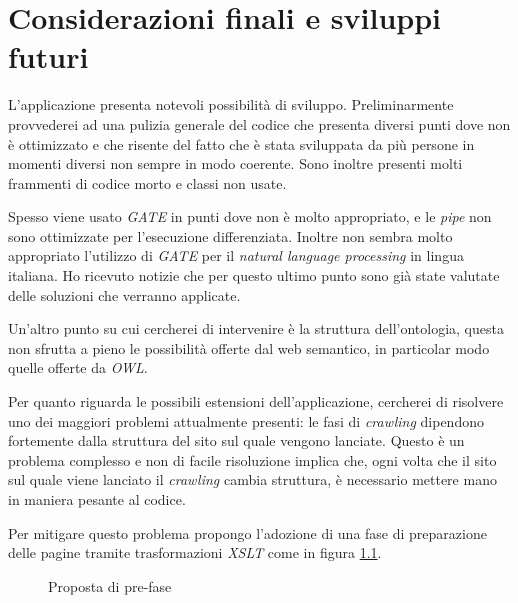 \documentclass[tesi.tex]{subfiles}
\begin{document}
\chapter{Considerazioni finali e sviluppi futuri}
L'applicazione presenta notevoli possibilit\`a di sviluppo.
Preliminarmente provvederei ad una pulizia generale del codice che
presenta diversi punti dove non \`e ottimizzato e che risente del
fatto che \`e stata sviluppata da pi\`u persone in momenti diversi non
sempre in modo coerente. Sono inoltre presenti molti frammenti di
codice morto e classi non usate. 

Spesso viene usato \emph{GATE} in punti dove non \`e molto appropriato, e le
\emph{pipe} non sono ottimizzate per l'esecuzione
differenziata. Inoltre non sembra molto appropriato l'utilizzo di
\emph{GATE} per il \emph{natural language processing} in lingua
italiana. Ho ricevuto notizie che per questo ultimo punto sono gi\`a
state valutate delle soluzioni che verranno applicate.

Un'altro punto su cui cercherei di intervenire \`e la struttura
dell'ontologia, questa non sfrutta a pieno le possibilit\`a offerte
dal web semantico, in particolar modo quelle offerte da \emph{OWL}. 

Per quanto riguarda le possibili estensioni dell'applicazione,
cercherei di risolvere uno dei maggiori problemi attualmente presenti:
le fasi di \emph{crawling} dipendono fortemente dalla struttura del
sito sul quale vengono lanciate. Questo \`e un problema complesso e
non di facile risoluzione implica che, ogni volta che
il sito sul quale viene lanciato il \emph{crawling} cambia struttura,
\`e necessario mettere mano in maniera pesante al codice.

Per mitigare questo problema propongo
l'adozione di una fase di preparazione delle pagine tramite
trasformazioni \emph{XSLT} come in figura \ref{fig:consFinXslt}.
\begin{figure}
  \begin{center}
  \end{center}
  \caption{Proposta di pre-fase}
  \label{fig:consFinXslt}
\end{figure}
\end{document}
